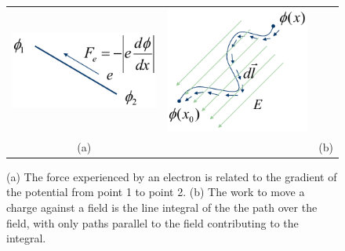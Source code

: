 \begin{figure}[tb]
\begin{center}
\begin{tabular}{ccc}
\includegraphics[width=.25\columnwidth]{mod2-2_ICtech_sld_14} &
\hspace{3cm}
\includegraphics[width=.3\columnwidth]{mod2-2_ICtech_sld_15} \\
(a) & & (b) \\
\end{tabular}
\end{center}
\caption{(a)  The force experienced by an electron is related to the gradient of the potential from point 1 to point 2.  (b)  The work to move a charge against a field is the line integral of the the path over the field, with only paths parallel to the field contributing to the integral.} \label{fig:mod2-2_ICtech_sld_14}
\end{figure}
